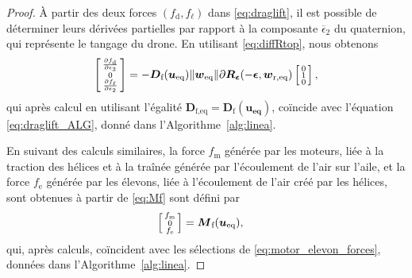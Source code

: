 \begin{proof}
À partir des deux forces $(f_{\text{d}} , f_{\ell})$ dans \eqref{eq:draglift}, il est possible de déterminer leurs dérivées partielles par rapport à la composante $\overline \epsilon_2$ du quaternion, qui représente le tangage du drone. En utilisant \eqref{eq:diffRtop}, nous obtenons
\begin{align}
    \left[ \begin{smallmatrix}\frac{\partial  f_{\text{d}}  }{\partial \epsilon_{2}} \\ 0 \\ \frac{\partial  f_{\ell}  }{\partial \epsilon_{2}} \end{smallmatrix} \right] = - \boldsymbol{D}_{\text{f}}(\boldsymbol{u_{\text{eq}}})  \lVert \boldsymbol{w}_{\mathrm{eq}} \rVert \partial \boldsymbol{R}_{\boldsymbol{ \epsilon}}( -\boldsymbol{ \epsilon}, \boldsymbol{w}_{\mathrm{r,eq}}) \left[ \begin{smallmatrix}0\\ 1\\ 0 \end{smallmatrix} \right],
\end{align}
qui après calcul en utilisant l'égalité $\boldsymbol{D}_{\text{f,eq}} = \boldsymbol{D}_{\text{f}}(\boldsymbol{u_{\text{eq}}})$,
coïncide avec l'équation \eqref{eq:draglift_ALG}, donné dans l'Algorithme~\ref{alg:linea}.

En suivant des calculs similaires,  la force
$f_{\text{m}}$ générée par les moteurs, liée à la traction des hélices et à la traînée générée par l'écoulement de l'air sur l'aile, et la force $f_{\text{e}}$ générée par les élevons, liée à l'écoulement de l'air créé par les hélices, sont obtenues à partir de \eqref{eq:Mf} sont défini par 
\begin{align}
\label{eq:motor_el}
    \left[ \begin{smallmatrix} f_{\text{m}}  \\ 0 \\ f_{\text{e}}  \end{smallmatrix} \right] &= \boldsymbol{M}_{\text{f}}(\boldsymbol{u_{\text{eq}}}) ,
\end{align}
qui, après calculs, coïncident avec les sélections de \eqref{eq:motor_elevon_forces}, données dans l'Algorithme~\ref{alg:linea}.


\end{proof}
